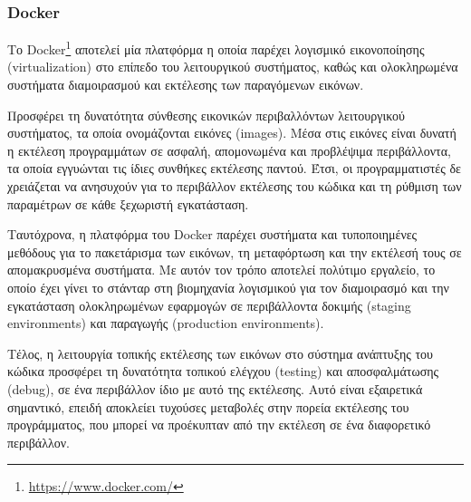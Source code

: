 \subsubsection{Docker} \label{subsection:4-2-1-2-docker}


Το Docker\footnote{\url{https://www.docker.com/}} αποτελεί μία πλατφόρμα η οποία παρέχει λογισμικό εικονοποίησης (virtualization) στο επίπεδο του λειτουργικού συστήματος, καθώς και ολοκληρωμένα συστήματα διαμοιρασμού και εκτέλεσης των παραγόμενων εικόνων.

Προσφέρει τη δυνατότητα σύνθεσης εικονικών περιβαλλόντων λειτουργικού συστήματος, τα οποία ονομάζονται εικόνες (images). Μέσα στις εικόνες είναι δυνατή η εκτέλεση προγραμμάτων σε ασφαλή, απομονωμένα και προβλέψιμα περιβάλλοντα, τα οποία εγγυώνται τις ίδιες συνθήκες εκτέλεσης παντού. Έτσι, οι προγραμματιστές δε χρειάζεται να ανησυχούν για το περιβάλλον εκτέλεσης του κώδικα και τη ρύθμιση των παραμέτρων σε κάθε ξεχωριστή εγκατάσταση.

Ταυτόχρονα, η πλατφόρμα του Docker παρέχει συστήματα και τυποποιημένες μεθόδους για το πακετάρισμα των εικόνων, τη μεταφόρτωση και την εκτέλεσή τους σε απομακρυσμένα συστήματα. Με αυτόν τον τρόπο αποτελεί πολύτιμο εργαλείο, το οποίο έχει γίνει το στάνταρ στη βιομηχανία λογισμικού για τον διαμοιρασμό και την εγκατάσταση ολοκληρωμένων εφαρμογών σε περιβάλλοντα δοκιμής (staging environments) και παραγωγής (production environments).

Τέλος, η λειτουργία τοπικής εκτέλεσης των εικόνων στο σύστημα ανάπτυξης του κώδικα προσφέρει τη δυνατότητα τοπικού ελέγχου (testing) και αποσφαλμάτωσης (debug), σε ένα περιβάλλον ίδιο με αυτό της εκτέλεσης. Αυτό είναι εξαιρετικά σημαντικό, επειδή αποκλείει τυχούσες μεταβολές στην πορεία εκτέλεσης του προγράμματος, που μπορεί να προέκυπταν από την εκτέλεση σε ένα διαφορετικό περιβάλλον.

